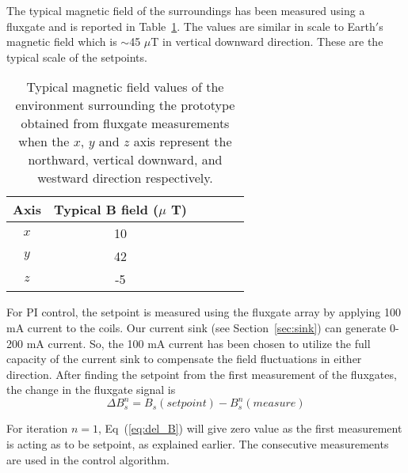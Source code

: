 The typical magnetic field of the surroundings has been measured using a fluxgate and is reported in Table~\ref{table:Benvironment}. The values are similar in scale to Earth$'$s magnetic field which is $\sim$45 $\mu$T in vertical downward direction. These are the typical scale of the setpoints.

\begin{table} [htb!]
    \centering
    \begin{tabular} { |c|c|c|c|c|c|} 
        \hline
        Axis & \makecell{Typical B field \\($\mu$ T)}\\
        \hline\hline
        $x$ & 10 \\ 
        \hline
        $y$ & 42 \\ 
        \hline
        $z$ & -5 \\ 
        \hline
    \end{tabular}
    \caption[Typical magnetic fields surrounding the prototype]{Typical magnetic field values of the environment surrounding the prototype obtained from fluxgate measurements when the $x$, $y$ and $z$ axis represent the northward, vertical downward, and westward direction respectively. }\label{table:Benvironment}
\end{table}

\FloatBarrier
For PI control, the setpoint is measured using the fluxgate array by applying 100 mA current to the coils. Our current sink (see Section~\ref{sec:sink}) can generate 0-200 mA current. So, the 100 mA current has been chosen to utilize the full capacity of the current sink to compensate the field fluctuations in either direction. After finding the setpoint from the first measurement of the fluxgates, the change in the fluxgate signal is
\begin{equation}\label{eq:del_B}
    \Delta B_s^n = B_s(setpoint) - B_s^n(measure)
\end{equation}

For iteration $n=1$, Eq~(\ref{eq:del_B}) will give zero value as the first measurement is acting as to be setpoint, as explained earlier. The consecutive measurements are used in the control algorithm. 

